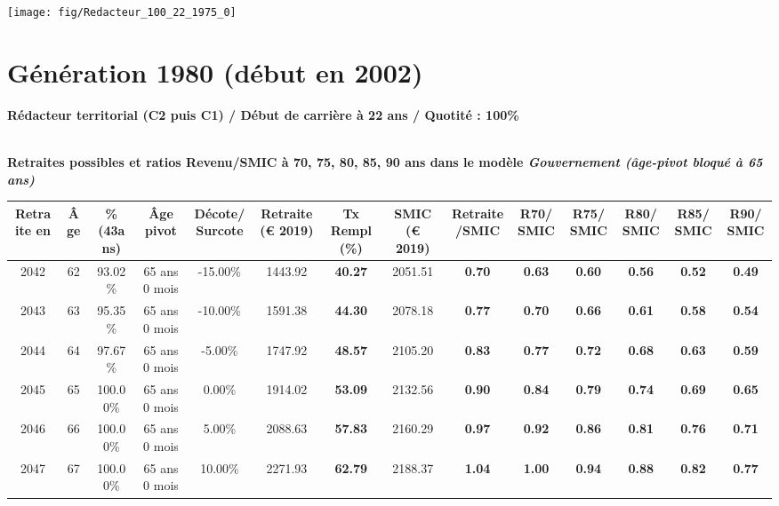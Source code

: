  {\hspace{-2.2cm}\texttt{[image: fig/Redacteur\_100\_22\_1975\_0]}} 

\newpage 
 
\section{Génération 1980 (début en 2002)\label{Redacteur_100_22_1980_0}} 
 
{\bf \noindent Rédacteur territorial (C2 puis C1) / Début de carrière à 22 ans / Quotité : 100\%}  ~ 

 ~\\{\bf \noindent Retraites possibles et ratios Revenu/SMIC à 70, 75, 80, 85, 90 ans dans le modèle \emph{Gouvernement (âge-pivot bloqué à 65 ans)}}  
 
\begin{adjustbox}{max width=\textwidth} 
\begin{tabular}[htb]{|c|c||c|c|c||c|c||c|c||c|c|c|c|c|} 
\hline 
 Retraite en &  Âge &  \%(43ans) &  Âge pivot &  Décote/Surcote &  Retraite (\euro{} 2019) &  Tx Rempl(\%) &  SMIC (\euro{} 2019) &  Retraite/SMIC &  R70/SMIC &  R75/SMIC &  R80/SMIC &  R85/SMIC &  R90/SMIC \\ 
\hline \hline 
 2042 &  62 &  93.02\% &  65 ans 0 mois &  -15.00\% &  1443.92 &  {\bf 40.27} &  2051.51 &  {\bf {\color{red} 0.70}} &  {\bf {\color{red} 0.63}} &  {\bf {\color{red} 0.60}} &  {\bf {\color{red} 0.56}} &  {\bf {\color{red} 0.52}} &  {\bf {\color{red} 0.49}} \\ 
\hline 
 2043 &  63 &  95.35\% &  65 ans 0 mois &  -10.00\% &  1591.38 &  {\bf 44.30} &  2078.18 &  {\bf {\color{red} 0.77}} &  {\bf {\color{red} 0.70}} &  {\bf {\color{red} 0.66}} &  {\bf {\color{red} 0.61}} &  {\bf {\color{red} 0.58}} &  {\bf {\color{red} 0.54}} \\ 
\hline 
 2044 &  64 &  97.67\% &  65 ans 0 mois &  -5.00\% &  1747.92 &  {\bf 48.57} &  2105.20 &  {\bf {\color{red} 0.83}} &  {\bf {\color{red} 0.77}} &  {\bf {\color{red} 0.72}} &  {\bf {\color{red} 0.68}} &  {\bf {\color{red} 0.63}} &  {\bf {\color{red} 0.59}} \\ 
\hline 
 2045 &  65 &  100.00\% &  65 ans 0 mois &  0.00\% &  1914.02 &  {\bf 53.09} &  2132.56 &  {\bf {\color{red} 0.90}} &  {\bf {\color{red} 0.84}} &  {\bf {\color{red} 0.79}} &  {\bf {\color{red} 0.74}} &  {\bf {\color{red} 0.69}} &  {\bf {\color{red} 0.65}} \\ 
\hline 
 2046 &  66 &  100.00\% &  65 ans 0 mois &  5.00\% &  2088.63 &  {\bf 57.83} &  2160.29 &  {\bf {\color{red} 0.97}} &  {\bf {\color{red} 0.92}} &  {\bf {\color{red} 0.86}} &  {\bf {\color{red} 0.81}} &  {\bf {\color{red} 0.76}} &  {\bf {\color{red} 0.71}} \\ 
\hline 
 2047 &  67 &  100.00\% &  65 ans 0 mois &  10.00\% &  2271.93 &  {\bf 62.79} &  2188.37 &  {\bf 1.04} &  {\bf {\color{red} 1.00}} &  {\bf {\color{red} 0.94}} &  {\bf {\color{red} 0.88}} &  {\bf {\color{red} 0.82}} &  {\bf {\color{red} 0.77}} \\ 
\hline 
\hline 
\end{tabular} 
\end{adjustbox} 
 
